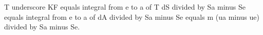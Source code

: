 T underscore KF equals integral from e to a of T dS divided by Sa minus Se equals integral from e to a of dA divided by Sa minus Se equals m (ua minus ue) divided by Sa minus Se.